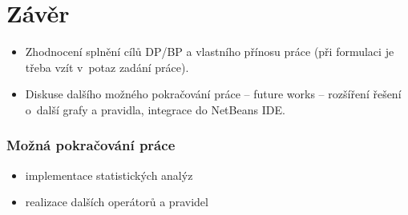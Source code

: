 \chapter{Závěr}

\begin{itemize}
\item Zhodnocení splnění cílů DP/BP a  vlastního přínosu práce (při formulaci je třeba vzít v~potaz zadání práce).
\item Diskuse dalšího možného pokračování práce -- future works -- rozšíření řešení o~další grafy a pravidla, integrace do NetBeans IDE.
\end{itemize}

\subsection*{Možná pokračování práce}
\begin{itemize}
\item implementace statistických analýz
\item realizace dalších operátorů a pravidel
\end{itemize}
